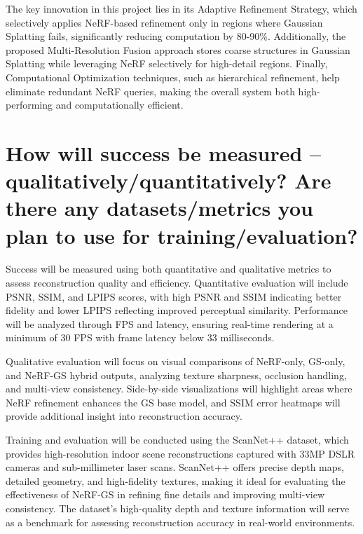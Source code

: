 \documentclass[10pt,letterpaper]{article}
\begin{document}
	The key innovation in this project lies in its Adaptive Refinement Strategy, which selectively applies NeRF-based refinement only in regions where Gaussian Splatting fails, significantly reducing computation by 80-90\%. Additionally, the proposed Multi-Resolution Fusion approach stores coarse structures in Gaussian Splatting while leveraging NeRF selectively for high-detail regions. Finally, Computational Optimization techniques, such as hierarchical refinement, help eliminate redundant NeRF queries, making the overall system both high-performing and computationally efficient.
	
	\section{How will success be measured – qualitatively/quantitatively? Are there any datasets/metrics you plan to use for training/evaluation?}
	
	Success will be measured using both quantitative and qualitative metrics to assess reconstruction quality and efficiency. Quantitative evaluation will include PSNR, SSIM, and LPIPS scores, with high PSNR and SSIM indicating better fidelity and lower LPIPS reflecting improved perceptual similarity. Performance will be analyzed through FPS and latency, ensuring real-time rendering at a minimum of 30 FPS with frame latency below 33 milliseconds.
	
	Qualitative evaluation will focus on visual comparisons of NeRF-only, GS-only, and NeRF-GS hybrid outputs, analyzing texture sharpness, occlusion handling, and multi-view consistency. Side-by-side visualizations will highlight areas where NeRF refinement enhances the GS base model, and SSIM error heatmaps will provide additional insight into reconstruction accuracy.
	
	Training and evaluation will be conducted using the ScanNet++ dataset, which provides high-resolution indoor scene reconstructions captured with 33MP DSLR cameras and sub-millimeter laser scans. ScanNet++ offers precise depth maps, detailed geometry, and high-fidelity textures, making it ideal for evaluating the effectiveness of NeRF-GS in refining fine details and improving multi-view consistency. The dataset’s high-quality depth and texture information will serve as a benchmark for assessing reconstruction accuracy in real-world environments.
	
\end{document}
